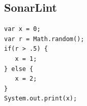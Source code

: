\documentclass[
   aspectratio=169, %
   10pt, %
   uniqueslidenumber,
   professionalfonts
]{beamer}
\begin{document}


\subsection{SonarLint}
\newsavebox\ExampleCodeCfG
\begin{lrbox}{\ExampleCodeCfG}
\begin{verbatim}
var x = 0;
var r = Math.random();
if(r > .5) {
   x = 1;
} else {
   x = 2;
}
System.out.print(x);
\end{verbatim}
\end{lrbox}
\end{document}
